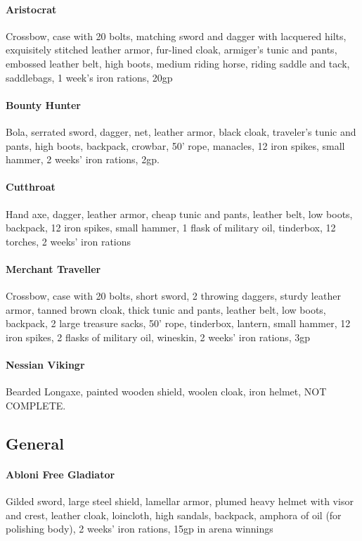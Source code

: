 \begin{multicols}{2}
\paragraph{Aristocrat} Crossbow, case with 20 bolts, matching sword and dagger with lacquered hilts, exquisitely stitched leather armor, fur-lined cloak, armiger’s tunic and pants, embossed leather belt, high boots, medium riding horse, riding saddle and tack, saddlebags, 1 week’s iron rations, 20gp

\paragraph{Bounty Hunter} Bola, serrated sword, dagger, net, leather armor, black cloak, traveler’s tunic and pants, high boots, backpack, crowbar, 50' rope, manacles, 12 iron spikes, small hammer, 2 weeks’ iron rations, 2gp.

\paragraph{Cutthroat} Hand axe, dagger, leather armor, cheap tunic and pants, leather belt, low boots, backpack, 12 iron spikes, small hammer, 1 flask of military oil, tinderbox, 12 torches, 2 weeks’ iron rations

\paragraph{Merchant Traveller} Crossbow, case with 20 bolts, short sword, 2 throwing daggers, sturdy leather armor, tanned brown cloak, thick tunic and pants, leather belt, low boots, backpack, 2 large treasure sacks, 50' rope, tinderbox, lantern, small hammer, 12 iron spikes, 2 flasks of military oil, wineskin, 2 weeks’ iron rations, 3gp

\paragraph{Nessian Vikingr} Bearded Longaxe, painted wooden shield, woolen cloak, iron helmet, NOT COMPLETE. 

\subsection{General} 
\paragraph{Abloni Free Gladiator} Gilded sword, large steel shield, lamellar armor, plumed heavy helmet with visor and crest, leather cloak, loincloth, high sandals, backpack, amphora of oil (for polishing body), 2 weeks’ iron rations, 15gp in arena winnings


\end{multicols}
